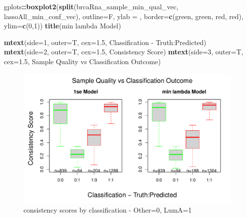 \documentclass[
]{book}
\newenvironment{Shaded}{\begin{snugshade}}{\end{snugshade}}
\newcommand{\DataTypeTok}[1]{\textcolor[rgb]{0.13,0.29,0.53}{#1}}
\newcommand{\DecValTok}[1]{\textcolor[rgb]{0.00,0.00,0.81}{#1}}
\newcommand{\FloatTok}[1]{\textcolor[rgb]{0.00,0.00,0.81}{#1}}
\newcommand{\KeywordTok}[1]{\textcolor[rgb]{0.13,0.29,0.53}{\textbf{#1}}}
\newcommand{\NormalTok}[1]{#1}
\newcommand{\OperatorTok}[1]{\textcolor[rgb]{0.81,0.36,0.00}{\textbf{#1}}}
\newcommand{\StringTok}[1]{\textcolor[rgb]{0.31,0.60,0.02}{#1}}
\begin{document}
\begin{Shaded}
\begin{Highlighting}[]
\NormalTok{gplots}\OperatorTok{::}\KeywordTok{boxplot2}\NormalTok{(}\KeywordTok{split}\NormalTok{(brcaRna\_sample\_min\_qual\_vec, lassoAll\_min\_conf\_vec), }
  \DataTypeTok{outline=}\NormalTok{F, }\DataTypeTok{ylab =} \StringTok{\textquotesingle{}\textquotesingle{}}\NormalTok{,}
  \DataTypeTok{border=}\KeywordTok{c}\NormalTok{(}\StringTok{\textquotesingle{}green\textquotesingle{}}\NormalTok{, }\StringTok{\textquotesingle{}green\textquotesingle{}}\NormalTok{, }\StringTok{\textquotesingle{}red\textquotesingle{}}\NormalTok{, }\StringTok{\textquotesingle{}red\textquotesingle{}}\NormalTok{),}
  \DataTypeTok{ylim=}\KeywordTok{c}\NormalTok{(}\DecValTok{0}\NormalTok{,}\DecValTok{1}\NormalTok{))}
\KeywordTok{title}\NormalTok{(}\StringTok{\textquotesingle{}min lambda Model\textquotesingle{}}\NormalTok{)}


\KeywordTok{mtext}\NormalTok{(}\DataTypeTok{side=}\DecValTok{1}\NormalTok{, }\DataTypeTok{outer=}\NormalTok{T, }\DataTypeTok{cex=}\FloatTok{1.5}\NormalTok{, }\StringTok{\textquotesingle{}Classification {-} Truth:Predicted\textquotesingle{}}\NormalTok{)}
\KeywordTok{mtext}\NormalTok{(}\DataTypeTok{side=}\DecValTok{2}\NormalTok{, }\DataTypeTok{outer=}\NormalTok{T, }\DataTypeTok{cex=}\FloatTok{1.5}\NormalTok{, }\StringTok{\textquotesingle{}Consistency Score\textquotesingle{}}\NormalTok{)}
\KeywordTok{mtext}\NormalTok{(}\DataTypeTok{side=}\DecValTok{3}\NormalTok{, }\DataTypeTok{outer=}\NormalTok{T, }\DataTypeTok{cex=}\FloatTok{1.5}\NormalTok{, }\StringTok{\textquotesingle{}Sample Quality vs Classification Outcome\textquotesingle{}}\NormalTok{)}
\end{Highlighting}
\end{Shaded}

\begin{figure}
\centering
\includegraphics{Static/figures/brca-rnaseq-plot-qual-conf-1.pdf}
\caption{\label{fig:brca-rnaseq-plot-qual-conf}consistency scores by classification - Other=0, LumA=1}
\end{figure}
\end{document}
